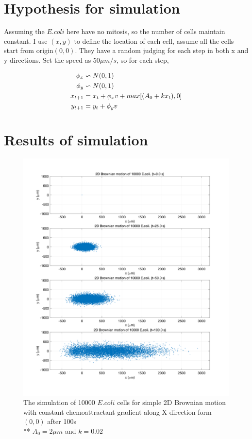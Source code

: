 \section{Hypothesis for simulation}

Assuming the $E.coli$ here have no mitosis, so the number of cells maintain constant.
I use $(x,y)$ to define the location of each cell, assume all the cells start from origin$(0,0)$. They have a random judging for each step in both x and y directions. Set the speed as $50 \mu m/s$, so for each step,

\begin{equation*} 
\begin{aligned} 
\centering
\phi_x &\backsim N(0,1) \\
\phi_y &\backsim N(0,1) \\
x_{t+1}  &=  x_{t} + \phi_x v + max[(A_0 + kx_t),0]\\ 
y_{t+1}  &=  y_{t} + \phi_y v \\ 
\end{aligned} 
\end{equation*}

\section{Results of simulation}

\begin{figure}[H]
\centering
\includegraphics[width=1\linewidth]{Figures/P2_fig1.png}
\caption{The simulation of 10000 $E.coli$ cells for simple 2D Brownian motion with constant chemoattractant gradient along X-direction form $(0,0)$ after 100s \\
** $A_0=2\mu m$ and $k=0.02$}
\label{P2_fig1}
\end{figure}

